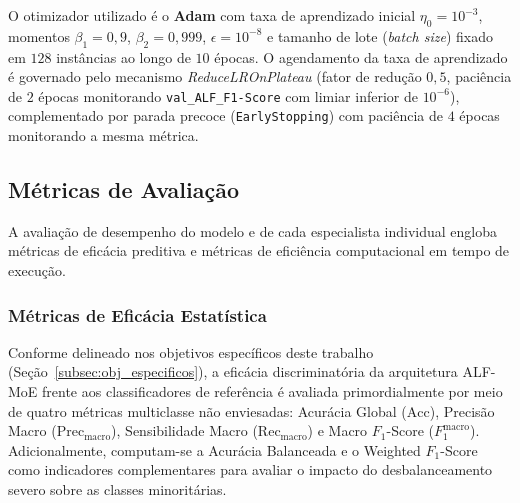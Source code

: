 O otimizador utilizado é o \textbf{Adam} com taxa de aprendizado inicial $\eta_0 = 10^{-3}$, momentos $\beta_1 = 0{,}9$, $\beta_2 = 0{,}999$, $\epsilon = 10^{-8}$ e tamanho de lote (\emph{batch size}) fixado em $128$ instâncias ao longo de $10$ épocas. O agendamento da taxa de aprendizado é governado pelo mecanismo \emph{ReduceLROnPlateau} (fator de redução $0{,}5$, paciência de $2$ épocas monitorando \texttt{val\_ALF\_F1-Score} com limiar inferior de $10^{-6}$), complementado por parada precoce (\texttt{EarlyStopping}) com paciência de $4$ épocas monitorando a mesma métrica.


\subsection{Métricas de Avaliação}
\label{subsec:metricas_avaliacao}

A avaliação de desempenho do modelo e de cada especialista individual engloba métricas de eficácia preditiva e métricas de eficiência computacional em tempo de execução.

\subsubsection{Métricas de Eficácia Estatística}

Conforme delineado nos objetivos específicos deste trabalho (Seção~\ref{subsec:obj_especificos}), a eficácia discriminatória da arquitetura ALF-MoE frente aos classificadores de referência é avaliada primordialmente por meio de quatro métricas multiclasse não enviesadas: Acurácia Global ($\mathrm{Acc}$), Precisão Macro ($\mathrm{Prec}_{\mathrm{macro}}$), Sensibilidade Macro ($\mathrm{Rec}_{\mathrm{macro}}$) e Macro $F_1$-Score ($F_1^{\mathrm{macro}}$). Adicionalmente, computam-se a Acurácia Balanceada e o Weighted $F_1$-Score como indicadores complementares para avaliar o impacto do desbalanceamento severo sobre as classes minoritárias.

